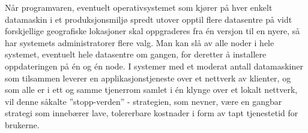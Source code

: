 Når programvaren, eventuelt operativsystemet som kjører på hver enkelt datamaskin i et produksjonsmiljø spredt utover opptil flere datasentre på vidt forskjellige geografiske lokasjoner skal oppgraderes fra én versjon til en nyere, så har systemets administratorer flere valg. Man kan slå av alle noder i hele systemet, eventuelt hele datasentre om gangen, for deretter å installere oppdateringen på én og én node. I systemer med et moderat antall datamaskiner som tilsammen leverer en applikasjonstjeneste over et nettverk av klienter, og som alle er i ett og samme tjenerrom samlet i én klynge over et lokalt nettverk, vil denne såkalte ''stopp-verden'' - strategien, som \cite{saur2016} nevner, være en gangbar strategi som innebærer lave, tolererbare kostnader i form av tapt tjenestetid for brukerne. %

